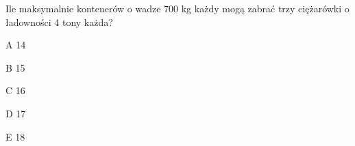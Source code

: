 \begin{tresc}
Ile maksymalnie kontenerów o wadze 700 kg każdy mogą zabrać trzy ciężarówki o ładowności 4 tony każda?
\end{tresc}
\begin{wariant}{A} 14 \end{wariant}
\begin{wariant}{B} 15 \end{wariant}
\begin{wariant}{C} 16 \end{wariant}
\begin{wariant}{D} 17 \end{wariant}
\begin{wariant}{E} 18 \end{wariant}
